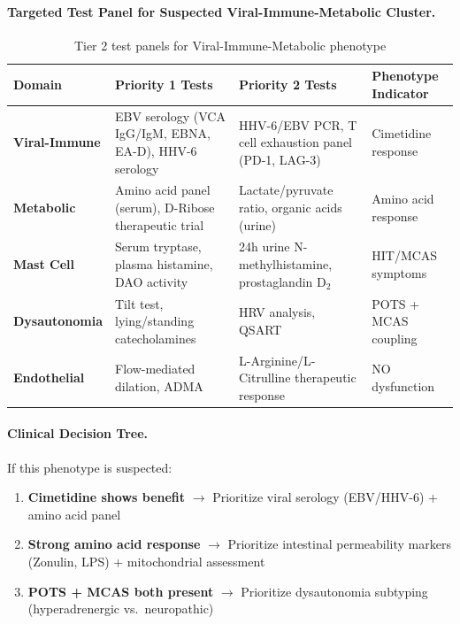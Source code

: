 \paragraph{Targeted Test Panel for Suspected Viral-Immune-Metabolic Cluster.}

\begin{table}[htbp]
\centering
\caption{Tier 2 test panels for Viral-Immune-Metabolic phenotype}
\label{tab:vim-testpanels}
\begin{tabular}{p{2.8cm}p{4cm}p{4cm}p{2.5cm}}
\toprule
\textbf{Domain} & \textbf{Priority 1 Tests} & \textbf{Priority 2 Tests} & \textbf{Phenotype Indicator} \\
\midrule
\textbf{Viral-Immune} & EBV serology (VCA IgG/IgM, EBNA, EA-D), HHV-6 serology & HHV-6/EBV PCR, T cell exhaustion panel (PD-1, LAG-3) & Cimetidine response \\
\addlinespace
\textbf{Metabolic} & Amino acid panel (serum), D-Ribose therapeutic trial & Lactate/pyruvate ratio, organic acids (urine) & Amino acid response \\
\addlinespace
\textbf{Mast Cell} & Serum tryptase, plasma histamine, DAO activity & 24h urine N-methylhistamine, prostaglandin D$_2$ & HIT/MCAS symptoms \\
\addlinespace
\textbf{Dysautonomia} & Tilt test, lying/standing catecholamines & HRV analysis, QSART & POTS + MCAS coupling \\
\addlinespace
\textbf{Endothelial} & Flow-mediated dilation, ADMA & L-Arginine/L-Citrulline therapeutic response & NO dysfunction \\
\bottomrule
\end{tabular}
\end{table}

\paragraph{Clinical Decision Tree.}

If this phenotype is suspected:
\begin{enumerate}
    \item \textbf{Cimetidine shows benefit} $\rightarrow$ Prioritize viral serology (EBV/HHV-6) + amino acid panel
    \item \textbf{Strong amino acid response} $\rightarrow$ Prioritize intestinal permeability markers (Zonulin, LPS) + mitochondrial assessment
    \item \textbf{POTS + MCAS both present} $\rightarrow$ Prioritize dysautonomia subtyping (hyperadrenergic vs.\ neuropathic)
\end{enumerate}

